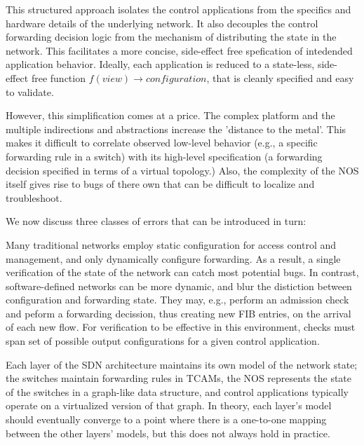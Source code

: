 This structured approach isolates the control applications from the specifics
and hardware details of the underlying network. It also decouples the control
forwarding decision logic from the mechanism of distributing the state in the
network. This facilitates a more concise, side-effect free spefication of
intedended application behavior. Ideally, each application is reduced to a
state-less, side-effect free function $f(view) \rightarrow configuration$, that is
cleanly specified and easy to validate.

However, this simplification comes at a price. The complex platform
and the multiple indirections and abstractions increase the 'distance to
the metal'. This makes it difficult to correlate observed low-level behavior
(e.g., a specific forwarding rule in a switch) with its high-level specification
(a forwarding decision specified in terms of a virtual topology.) Also, the
complexity of the NOS itself gives rise to bugs of there own that can be
difficult to localize and troubleshoot. 

We now discuss three classes of errors that can be introduced in turn:

 Many traditional networks employ static configuration
for access control and management, and only dynamically configure forwarding.
As a result, a single verification of the state of the network can catch most potential bugs. 
In contrast, software-defined networks can be more dynamic, and blur the distiction between configuration
and forwarding state. They may, e.g., perform an admission check and peform a forwarding decission, 
thus creating new FIB entries, on the arrival of each new flow.  For verification to be
effective in this environment, checks must span set of possible output configurations for a given control
application.

  Each layer of the SDN architecture
maintains its own model of the network state; the switches maintain forwarding
rules in TCAMs, the NOS represents the state of the switches in a graph-like data
structure, and control applications typically operate on 
a virtualized version of that graph. In theory, each layer's model should eventually
converge to a point where there is a one-to-one mapping 
between the other layers' models, but this does not always hold in practice.

